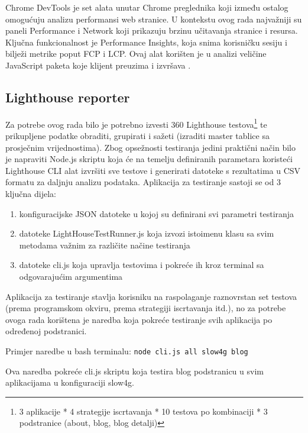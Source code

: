Chrome DevTools je set alata unutar Chrome preglednika koji između ostalog omogućuju analizu performansi web stranice. U kontekstu ovog rada najvažniji su paneli Performance i Network koji prikazuju brzinu učitavanja stranice i resursa. Ključna funkcionalnost je Performance Insights, koja snima korisničku sesiju i bilježi metrike poput FCP i LCP. Ovaj alat korišten je u analizi veličine JavaScript paketa koje klijent preuzima i izvršava \cite{nordstrom2023comparison}.

\subsection{Lighthouse reporter}

Za potrebe ovog rada bilo je potrebno izvesti 360 Lighthouse testova\footnote{3 aplikacije * 4 strategije iscrtavanja * 10 testova po kombinaciji * 3 podstranice (about, blog, blog detalji)} te prikupljene podatke obraditi, grupirati i sažeti (izraditi master tablice sa prosječnim vrijednostima). Zbog opsežnosti testiranja jedini praktični način bilo je napraviti Node.js skriptu koja će na temelju definiranih parametara koristeći Lighthouse CLI alat izvršiti sve testove i generirati datoteke s rezultatima u CSV formatu za daljnju analizu podataka.
Aplikacija za testiranje sastoji se od 3 ključna dijela:
\begin{enumerate}
    \item konfiguracijske JSON datoteke u kojoj su definirani svi parametri testiranja
    \item datoteke LightHouseTestRunner.js koja izvozi istoimenu klasu sa svim metodama važnim za različite načine testiranja
    \item datoteke cli.js koja upravlja testovima i pokreće ih kroz terminal sa odgovarajućim argumentima
\end{enumerate}

Aplikacija za testiranje stavlja korisniku na raspolaganje raznovrstan set testova (prema programskom okviru, prema strategiji iscrtavanja itd.), no za potrebe ovoga rada korištena je naredba koja pokreće testiranje svih aplikacija po određenoj podstranici.

\bigskip

Primjer naredbe u bash terminalu:
\texttt{node cli.js all slow4g blog}

Ova naredba pokreće cli.js skriptu koja testira blog podstranicu u svim aplikacijama u konfiguraciji slow4g.

